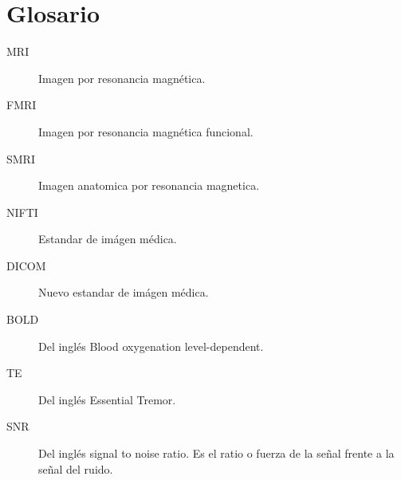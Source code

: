 
\chapter{Glosario}
\begin{description}
\item[MRI] Imagen por resonancia magnética. \label{glos:mri}
\item[FMRI] Imagen por resonancia magnética funcional. \label{glos:fmri}
\item[SMRI] Imagen anatomica por resonancia magnetica. \label{glos:smri}
\item[NIFTI] Estandar de imágen médica. \label{glos:nifti}
\item[DICOM] Nuevo estandar de imágen médica. \label{glos:dicom}
\item[BOLD] Del inglés Blood oxygenation level-dependent. \label{glos:bold}
\item[TE] Del inglés Essential Tremor. \label{glos:et}
\item[SNR] Del inglés signal to noise ratio. Es el ratio o fuerza de la señal frente a la señal del ruido. \label{glos:snr}
\end{description}